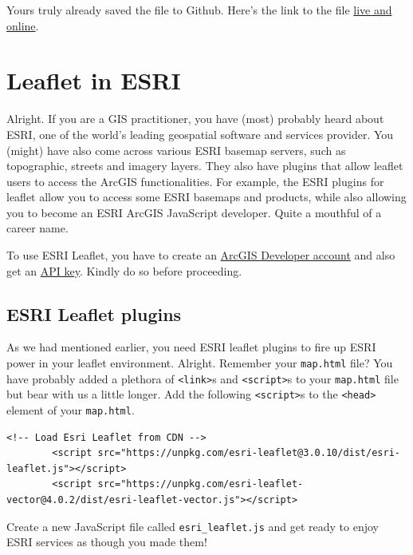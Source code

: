 \documentclass[
]{book}
\begin{document}
Yours truly already saved the file to Github. Here's the link to the file \href{https://sammigachuhi.github.io/elearning_template_demo/}{live and online}.

\hypertarget{leaflet-in-esri}{%
\chapter{Leaflet in ESRI}\label{leaflet-in-esri}}

Alright. If you are a GIS practitioner, you have (most) probably heard about ESRI, one of the world's leading geospatial software and services provider. You (might) have also come across various ESRI basemap servers, such as topographic, streets and imagery layers. They also have plugins that allow leaflet users to access the ArcGIS functionalities. For example, the ESRI plugins for leaflet allow you to access some ESRI basemaps and products, while also allowing you to become an ESRI ArcGIS JavaScript developer. Quite a mouthful of a career name.

To use ESRI Leaflet, you have to create an \href{https://developers.arcgis.com/dashboard/}{ArcGIS Developer account} and also get an \href{https://developers.arcgis.com/esri-leaflet/authentication/create-an-api-key/}{API key}. Kindly do so before proceeding.

\hypertarget{esri-leaflet-plugins}{%
\section{ESRI Leaflet plugins}\label{esri-leaflet-plugins}}

As we had mentioned earlier, you need ESRI leaflet plugins to fire up ESRI power in your leaflet environment. Alright. Remember your \texttt{map.html} file? You have probably added a plethora of \texttt{\textless{}link\textgreater{}}s and \texttt{\textless{}script\textgreater{}}s to your \texttt{map.html} file but bear with us a little longer. Add the following \texttt{\textless{}script\textgreater{}}s to the \texttt{\textless{}head\textgreater{}} element of your \texttt{map.html}.

\begin{verbatim}
<!-- Load Esri Leaflet from CDN -->
        <script src="https://unpkg.com/esri-leaflet@3.0.10/dist/esri-leaflet.js"></script>
        <script src="https://unpkg.com/esri-leaflet-vector@4.0.2/dist/esri-leaflet-vector.js"></script>
\end{verbatim}

Create a new JavaScript file called \texttt{esri\_leaflet.js} and get ready to enjoy ESRI services as though you made them!
\end{document}
